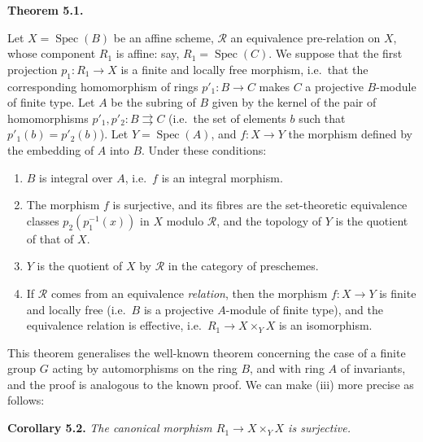 \documentclass{article}
\providecommand{\tightlist}{%
  \setlength{\itemsep}{0pt}\setlength{\parskip}{0pt}}
\newenvironment{itenv}[1]
  {\phantomsection\par\smallskip\noindent\textbf{#1.}\itshape}
  {\par\smallskip}
\newcommand{\oldpage}[1]{\marginpar{\footnotesize$\Big\vert$ \textit{p.~#1}}}
\theoremstyle{definition}
\theoremstyle{definition}
\theoremstyle{definition}
\theoremstyle{definition}
\theoremstyle{remark}
\begin{document}
\hypertarget{fga-3-iii-theorem-5.1}{}
\begin{itenv}{Theorem 5.1}

Let \(X=\operatorname{Spec}(B)\) be an affine scheme, \({\mathcal{R}}\) an equivalence pre-relation on \(X\), whose component \(R_1\) is affine: say, \(R_1=\operatorname{Spec}(C)\).
We suppose that the first projection \(p_1\colon R_1\to X\) is a finite and locally free morphism, i.e.~that the corresponding homomorphism of rings \(p'_1\colon B\to C\) makes \(C\) a projective \(B\)-module of finite type.
Let \(A\) be the subring of \(B\) given by the kernel of the pair of homomorphisms \(p'_1,p'_2\colon B\rightrightarrows C\) (i.e.~the set of elements \(b\) such that \(p'_1(b)=p'_2(b)\)).
Let \(Y=\operatorname{Spec}(A)\), and \(f\colon X\to Y\) the morphism defined by the embedding of \(A\) into \(B\).
\oldpage{212-13}Under these conditions:

\begin{enumerate}
\def\labelenumi{\roman{enumi}.}
\tightlist
\item
  \(B\) is integral over \(A\), i.e.~\(f\) is an integral morphism.
\item
  The morphism \(f\) is surjective, and its fibres are the set-theoretic equivalence classes
  \(p_2(p_1^{-1}(x))\) in \(X\) modulo \({\mathcal{R}}\), and the topology of \(Y\) is the quotient of that of \(X\).
\item
  \(Y\) is the quotient of \(X\) by \({\mathcal{R}}\) in the category of preschemes.
\item
  If \({\mathcal{R}}\) comes from an equivalence \emph{relation}, then the morphism \(f\colon X\to Y\) is finite and locally free (i.e.~\(B\) is a projective \(A\)-module of finite type), and the equivalence relation is effective, i.e.~\(R_1\to X\times_Y X\) is an isomorphism.
\end{enumerate}

\end{itenv}

This theorem generalises the well-known theorem concerning the case of a finite group \(G\) acting by automorphisms on the ring \(B\), and with ring \(A\) of invariants, and the proof is analogous to the known proof.
We can make (iii) more precise as follows:

\leavevmode{}%
\begin{itenv}{Corollary 5.2}
The canonical morphism \(R_1\to X\times_Y X\) is \emph{surjective}.

\end{itenv}
\end{document}
